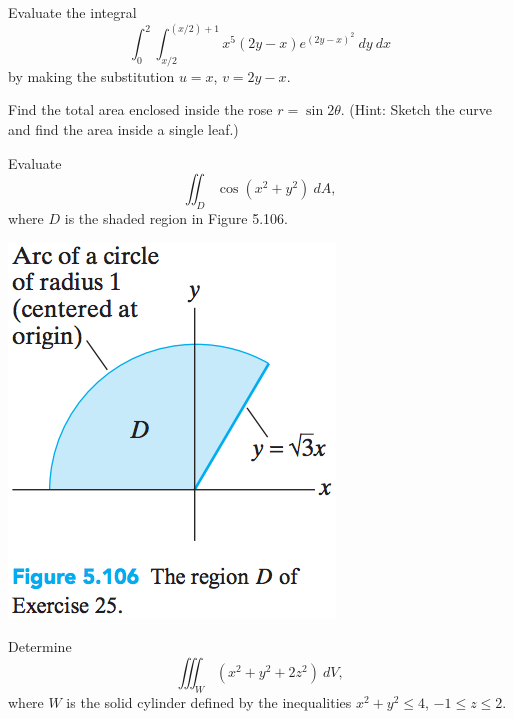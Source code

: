 \documentclass[12pt,letterpaper]{hmcpset}
\begin{document}

\begin{problem}[Colley 5.5.9]
    Evaluate the integral
    \[
        \int_0^2\int_{x/2}^{(x/2)+1}x^5(2y-x)e^{(2y-x)^2}~dy~dx
    \]
    by making the substitution $u=x$, $v=2y-x$.
\end{problem}
\begin{solution}
    \vfill
\end{solution}
\newpage

\begin{problem}[Colley 5.5.20]
    Find the total area enclosed inside the rose $r=\sin
    2\theta$. (Hint: Sketch the curve and find the area inside a
    single leaf.)
\end{problem}
\begin{solution}
    \vfill
\end{solution}
\newpage

\begin{problem}[Colley 5.5.25]
    Evaluate
    \[
        \iint_D\cos(x^2+y^2)~dA,
    \]
    where $D$ is the shaded region in Figure 5.106.
    \begin{center}
        \includegraphics{img/5_5_25}
    \end{center}
\end{problem}
\begin{solution}
    \vfill
\end{solution}
\newpage

\begin{problem}[Colley 5.5.31]
    Determine
    \[
        \iiint_W(x^2+y^2+2z^2)~dV,
    \]
    where $W$ is the solid cylinder defined by the inequalities
    $x^2+y^2\leq4$, $-1\leq z\leq2$.
\end{problem}
\begin{solution}
    \vfill
\end{solution}
\newpage
\end{document}
